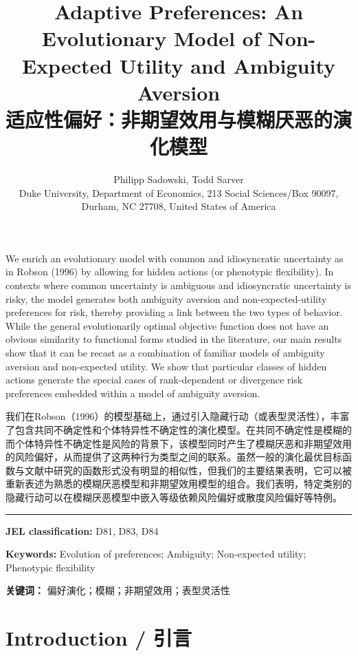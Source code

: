 \documentclass[12pt,a4paper]{article}
\title{\textbf{Adaptive Preferences: An Evolutionary Model of Non-Expected Utility and Ambiguity Aversion}\\[5pt]
       \large 适应性偏好：非期望效用与模糊厌恶的演化模型}
\author{Philipp Sadowski, Todd Sarver\\[3pt]
        \small Duke University, Department of Economics, 213 Social Sciences/Box 90097, Durham, NC 27708, United States of America}
\date{}
\newenvironment{original}
  {\par\noindent\color{black}\smallskip}
  {\par\smallskip}
\newenvironment{translation}
  {\par\noindent\color{blue!70!black}\smallskip}
  {\par\medskip\hrule\medskip}
\begin{document}
\maketitle

\begin{original}
We enrich an evolutionary model with common and idiosyncratic uncertainty as in Robson (1996) by allowing for hidden actions (or phenotypic flexibility). In contexts where common uncertainty is ambiguous and idiosyncratic uncertainty is risky, the model generates both ambiguity aversion and non-expected-utility preferences for risk, thereby providing a link between the two types of behavior. While the general evolutionarily optimal objective function does not have an obvious similarity to functional forms studied in the literature, our main results show that it can be recast as a combination of familiar models of ambiguity aversion and non-expected utility. We show that particular classes of hidden actions generate the special cases of rank-dependent or divergence risk preferences embedded within a model of ambiguity aversion.
\end{original}
\begin{translation}
我们在Robson（1996）的模型基础上，通过引入隐藏行动（或表型灵活性），丰富了包含共同不确定性和个体特异性不确定性的演化模型。在共同不确定性是模糊的而个体特异性不确定性是风险的背景下，该模型同时产生了模糊厌恶和非期望效用的风险偏好，从而提供了这两种行为类型之间的联系。虽然一般的演化最优目标函数与文献中研究的函数形式没有明显的相似性，但我们的主要结果表明，它可以被重新表述为熟悉的模糊厌恶模型和非期望效用模型的组合。我们表明，特定类别的隐藏行动可以在模糊厌恶模型中嵌入等级依赖风险偏好或散度风险偏好等特例。
\end{translation}

\bigskip
\noindent\textbf{JEL classification:} D81, D83, D84

\noindent\textbf{Keywords:} Evolution of preferences; Ambiguity; Non-expected utility; Phenotypic flexibility

\noindent\textbf{关键词：} 偏好演化；模糊；非期望效用；表型灵活性

\newpage

\section{Introduction / 引言}
\end{document}
